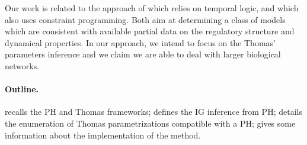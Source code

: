 
Our work is related to the approach of \cite{Khalis09} which relies on temporal logic, and \cite{20646302,DBLP:conf/ipcat/CorblinFTCT12} which also uses constraint programming. Both aim at determining a class of models which are consistent with available partial data on the regulatory structure and dynamical properties.
In our approach, we intend to focus on the Thomas' parameters inference and we claim we are able to deal with larger biological networks.

\paragraph{Outline.}
 recalls the PH and Thomas frameworks;
 defines the IG inference from PH;
 details the enumeration of Thomas parametrizations compatible with a PH;
 gives some information about the implementation of the method.
